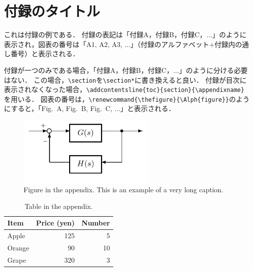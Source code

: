 \section{付録のタイトル}
\label{sec:appendix_a}

これは付録の例である．
付録の表記は「付録A，付録B，付録C，...」のように表示され，図表の番号は「A1, A2, A3, ...」（付録のアルファベット+付録内の通し番号）と表示される．

付録が一つのみである場合，「付録A，付録B，付録C，...」のように分ける必要はない．
この場合，\verb|\section|を\verb|\section*|に書き換えると良い．
付録が目次に表示されなくなった場合，\verb|\addcontentsline{toc}{section}{\appendixname}|を用いる．
図表の番号は，\verb|\renewcommand{\thefigure}{\Alph{figure}}|のようにすると，「Fig.~A, Fig.~B, Fig.~C, ...」と表示される．

\begin{figure}
  \centering
  \includegraphics[width=0.6\textwidth]{fig/example.pdf}
  \caption{Figure in the appendix.
    This is an example of a very long caption.
    \lipsum[1]}
  \label{fig:appendix}
\end{figure}

\begin{table}
  \centering
  \caption{Table in the appendix.}
  \label{tab:appendix}
  \begin{tabular}{lrr}
    \hline
    Item   & Price (yen) & Number \\
    \hline
    Apple  & 125         & 5      \\
    Orange & 90          & 10     \\
    Grape  & 320         & 3      \\
    \hline
  \end{tabular}
\end{table}

\clearpage

